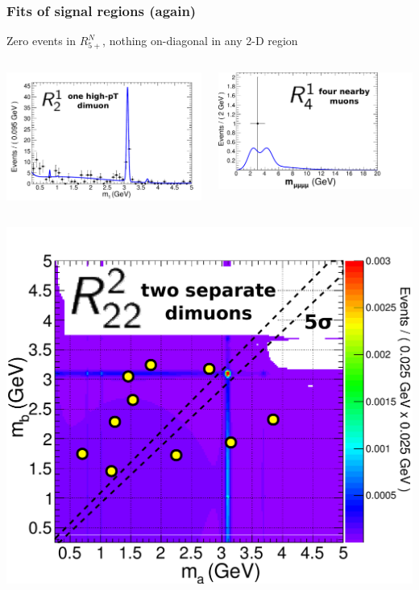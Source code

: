 \documentclass[compress]{beamer}
\begin{document}
\begin{frame}
\frametitle{Fits of signal regions (again)}

Zero events in $R^N_{5+}$, nothing on-diagonal in any 2-D region

\begin{columns}
\includegraphics[width=\linewidth]{signal_a1_data-bkgpdf.pdf}

\includegraphics[width=\linewidth]{model_data_a2_m_inv_w2.pdf}
\end{columns}

\begin{columns}
\centering \includegraphics[width=0.9\linewidth]{b1_2dpdf.pdf}


\end{columns}
\end{frame}
\end{document}
